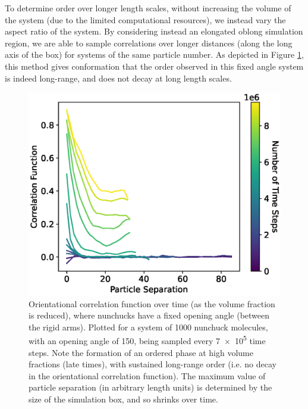 \documentclass[11pt, a4paper]{article} %
\begin{document}
To determine order over longer length scales, without increasing the volume of the system (due to the limited computational resources), we instead vary the aspect ratio of the system. By considering instead an elongated oblong simulation region, we are able to sample correlations over longer distances (along the long axis of the box) for systems of the same particle number. As depicted in Figure \ref{fig:num_fa_correlation_mol}, this method gives conformation that the order observed in this fixed angle system is indeed long-range, and does not decay at long length scales.

\begin{figure} [h!]
	\centering
	\includegraphics[width=0.7\linewidth]{Figures/num_fa_correlation_mol}
	\caption{Orientational correlation function over time (as the volume fraction is reduced), where nunchucks have a fixed opening angle (between the rigid arms). Plotted for a system of \num{1000} nunchuck molecules, with an opening angle of \SI{150}{\deg}, being sampled every \num{7e5} time steps. Note the formation of an ordered phase at high volume fractions (late times), with sustained long-range order (i.e. no decay in the orientational correlation function). The maximum value of particle separation (in arbitrary length units) is determined by the size of the simulation box, and so shrinks over time. }
	\label{fig:num_fa_correlation_mol}
\end{figure}  %
\end{document}
